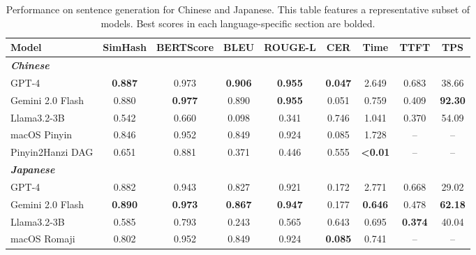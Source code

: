 \documentclass[10pt, a4paper]{article}
\begin{document}
\begin{table}[h]
\centering
\small
\caption{Performance on sentence generation for Chinese and Japanese. This table features a representative subset of models. Best scores in each language-specific section are bolded.}
\label{tab:sentence_gen_results}
\begin{tabular}{l cccccccc}
\toprule
\textbf{Model} & \textbf{SimHash} & \textbf{BERTScore} & \textbf{BLEU} & \textbf{ROUGE-L} & \textbf{CER} & \textbf{Time} & \textbf{TTFT} & \textbf{TPS} \\
\midrule
\multicolumn{9}{l}{\textit{\textbf{Chinese}}} \\
GPT-4 & \textbf{0.887} & 0.973 & \textbf{0.906} & \textbf{0.955} & \textbf{0.047} & 2.649 & 0.683 & 38.66 \\
Gemini 2.0 Flash & 0.880 & \textbf{0.977} & 0.890 & \textbf{0.955} & 0.051 & 0.759 & 0.409 & \textbf{92.30} \\
Llama3.2-3B & 0.542 & 0.660 & 0.098 & 0.341 & 0.746 & 1.041 & {0.370} & 54.09 \\
macOS Pinyin & 0.846 & 0.952 & 0.849 & 0.924 & 0.085 & 1.728 & -- & -- \\
Pinyin2Hanzi DAG & 0.651 & 0.881 & 0.371 & 0.446 & 0.555 & \textbf{<0.01} & -- & -- \\
\midrule
\multicolumn{9}{l}{\textit{\textbf{Japanese}}} \\
GPT-4 & 0.882 & 0.943 & 0.827 & 0.921 & 0.172 & 2.771 & 0.668 & 29.02 \\
Gemini 2.0 Flash & \textbf{0.890} & \textbf{0.973} & \textbf{0.867} & \textbf{0.947} & 0.177 & \textbf{0.646} & 0.478 & \textbf{62.18} \\
Llama3.2-3B & 0.585 & 0.793 & 0.243 & 0.565 & 0.643 & 0.695 & \textbf{0.374} & 40.04 \\
macOS Romaji & 0.802 & 0.952 & 0.849 & 0.924 & \textbf{0.085} & 0.741 & -- & -- \\
\bottomrule
\end{tabular}
\end{table}

\end{document}

